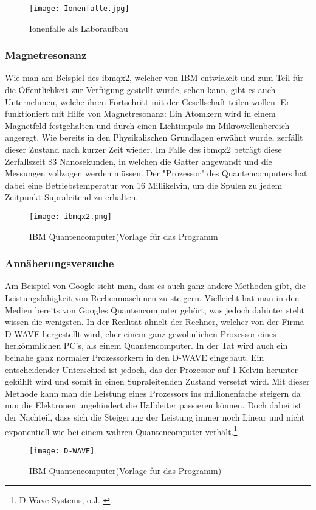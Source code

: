 \documentclass[12pt]{report}
\begin{document}
\begin{figure}[h]
\centering
	\texttt{[image: Ionenfalle.jpg]}
 	 \caption{
 	Ionenfalle als Laboraufbau
 	 }
 	
\end{figure}



	
\subsubsection{Magnetresonanz}
Wie man am Beispiel des ibmqx2, welcher von IBM entwickelt und zum Teil für die Öffentlichkeit zur Verfügung gestellt wurde, sehen kann, gibt es auch Unternehmen, welche ihren Fortschritt mit der Gesellschaft teilen wollen. Er funktioniert mit Hilfe von Magnetresonanz: Ein Atomkern wird in einem Magnetfeld festgehalten und durch einen Lichtimpuls im Mikrowellenbereich angeregt. Wie bereits in den Physikalischen Grundlagen erwähnt wurde, zerfällt dieser Zustand nach kurzer Zeit wieder. Im Falle des ibmqx2 beträgt diese Zerfallszeit 83 Nanosekunden, in welchen die Gatter angewandt und die Messungen vollzogen werden müssen. Der "Prozessor" des Quantencomputers hat dabei eine Betriebstemperatur von 16 Millikelvin, um die Spulen zu jedem Zeitpunkt Supraleitend zu erhalten.\newline
\begin{figure}[h]
\centering
	\texttt{[image: ibmqx2.png]}
 	 \caption{
 	 IBM Quantencomputer(Vorlage für das Programm
 	 }
 	
\end{figure}
\newpage
\subsubsection{Annäherungsversuche}
Am Beispiel von Google sieht man, dass es auch ganz andere Methoden gibt, die Leistungsfähigkeit von Rechenmaschinen zu steigern. Vielleicht hat man in den Medien bereits von Googles Quantencomputer gehört, was jedoch dahinter steht wissen die wenigsten. In der Realität ähnelt der Rechner, welcher von der Firma D-WAVE hergestellt wird, eher einem ganz gewöhnlichen Prozessor eines herkömmlichen PC's, als einem Quantencomputer. In der Tat wird auch ein beinahe ganz normaler Prozessorkern in den D-WAVE eingebaut. Ein entscheidender Unterschied ist jedoch, das der Prozessor auf 1 Kelvin herunter gekühlt wird und somit in einen Supraleitenden Zustand versetzt wird. Mit dieser Methode kann man die Leistung eines Prozessors ins millionenfache steigern da nun die Elektronen ungehindert die Halbleiter passieren können. Doch dabei ist der Nachteil, dass sich die Steigerung der Leistung immer noch Linear und nicht exponentiell wie bei einem wahren Quantencomputer verhält.\footnote{D-Wave Systems, o.J. \cite{a223-1}}
\begin{figure}[h]
\centering
\texttt{[image: D-WAVE]}

\caption{IBM Quantencomputer(Vorlage für das Programm)}
\end{figure}
\end{document}
